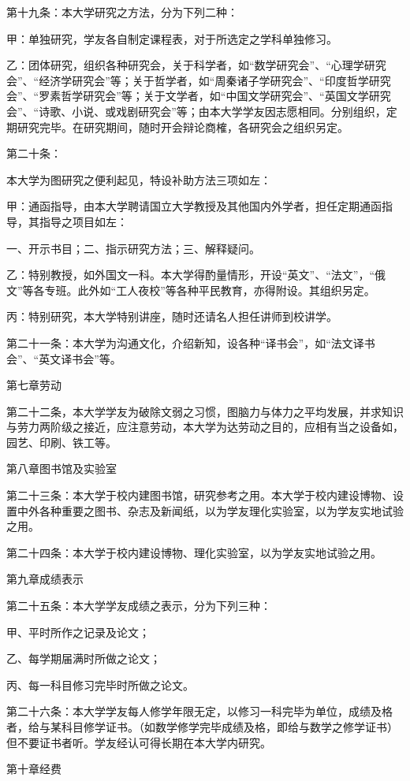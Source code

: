 第十九条：本大学研究之方法，分为下列二种：

甲：单独研究，学友各自制定课程表，对于所选定之学科单独修习。

乙：团体研究，组织各种研究会，关于科学者，如“数学研究会”、“心理学研究会”、“经济学研究会”等；关于哲学者，如“周秦诸子学研究会”、“印度哲学研究会”、“罗素哲学研究会”等；关于文学者，如“中国文学研究会”、“英国文学研究会”、“诗歌、小说、或戏剧研究会”等；由本大学学友因志愿相同。分别组织，定期研究完毕。在研究期间，随时开会辩论商榷，各研究会之组织另定。

第二十条：

本大学为图研究之便利起见，特设补助方法三项如左：

甲：通函指导，由本大学聘请国立大学教授及其他国内外学者，担任定期通函指导，其指导之项目如左：

一、开示书目；二、指示研究方法；三、解释疑问。

乙：特别教授，如外国文一科。本大学得酌量情形，开设“英文”、“法文”，“俄文”等各专班。此外如“工人夜校”等各种平民教育，亦得附设。其组织另定。

丙：特别研究，本大学特别讲座，随时还请名人担任讲师到校讲学。

第二十一条：本大学为沟通文化，介绍新知，设各种“译书会”，如“法文译书会”、“英文译书会”等。

第七章劳动

第二十二条，本大学学友为破除文弱之习惯，图脑力与体力之平均发展，并求知识与劳力两阶级之接近，应注意劳动，本大学为达劳动之目的，应相有当之设备如，园艺、印刷、铁工等。

第八章图书馆及实验室

第二十三条：本大学于校内建图书馆，研究参考之用。本大学于校内建设博物、设置中外各种重要之图书、杂志及新闻纸，以为学友理化实验室，以为学友实地试验之用。

第二十四条：本大学于校内建设博物、理化实验室，以为学友实地试验之用。

第九章成绩表示

第二十五条：本大学学友成绩之表示，分为下列三种：

甲、平时所作之记录及论文；

乙、每学期届满时所做之论文；

丙、每一科目修习完毕时所做之论文。

第二十六条：本大学学友每人修学年限无定，以修习一科完毕为单位，成绩及格者，给与某科目修学证书。（如数学修学完毕成绩及格，即给与数学之修学证书）但不要证书者听。学友经认可得长期在本大学内研究。

第十章经费

